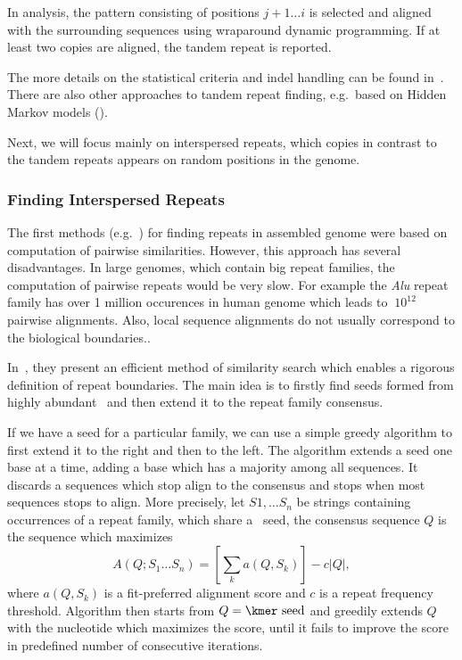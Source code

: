 In analysis, the pattern consisting of positions $j+1\dots i$ is selected and aligned with the surrounding sequences using wraparound dynamic programming\cite{fischetti1992apostolico, myers1989approximate}. If at least two copies are aligned, the tandem repeat is reported.

The more details on the statistical criteria and indel handling can be found in~\cite{trf}. There are also other approaches to tandem repeat finding, e.g.\ based on Hidden Markov models (\cite{tantan, nanasi2014probabilistic}).

Next, we will focus mainly on interspersed repeats, which copies in contrast to the tandem repeats appears on random positions in the genome.

\subsubsection{Finding Interspersed Repeats}

The first methods (e.g.~\cite{reputer, repeatfinder, recon, repeatgluer, piler}) for finding repeats in assembled genome were based on computation of pairwise similarities. However, this approach has several disadvantages. In large genomes, which contain big repeat families, the computation of pairwise repeats would be very slow. For example the \textit{Alu} repeat family has over 1 million occurences in human genome which leads to $~10^{12}$ pairwise alignments.
Also, local sequence alignments do not usually correspond to the biological boundaries.\cite{recon}.

In~\cite{repscout}, they present an efficient method of similarity search which enables a rigorous definition of repeat boundaries. The main idea is to firstly find seeds formed from highly abundant \kmers\ and then extend it to the repeat family consensus.

If we have a seed for a particular family, we can use a simple greedy algorithm to first extend it to the right and then to the left. The algorithm extends a seed one base at a time, adding a base which has a majority among all sequences. It discards a sequences which stop align to the consensus and stops when most sequences stops to align. More precisely, let $S1,\dots S_n$ be strings containing occurrences of a repeat family, which share a \kmer\ seed, the consensus sequence $Q$ is the sequence which maximizes
$$A(Q; S_1 \dots S_n) = \left[\sum_k a(Q, S_k)\right] - c |Q|,$$
where $a(Q, S_k)$ is a fit-preferred\cite{repscout} alignment score and $c$ is a repeat frequency threshold.
Algorithm then starts from $Q = \text{\kmer\ seed}$ and greedily extends $Q$ with the nucleotide which maximizes the score, until it fails to improve the score in predefined number of consecutive iterations.

